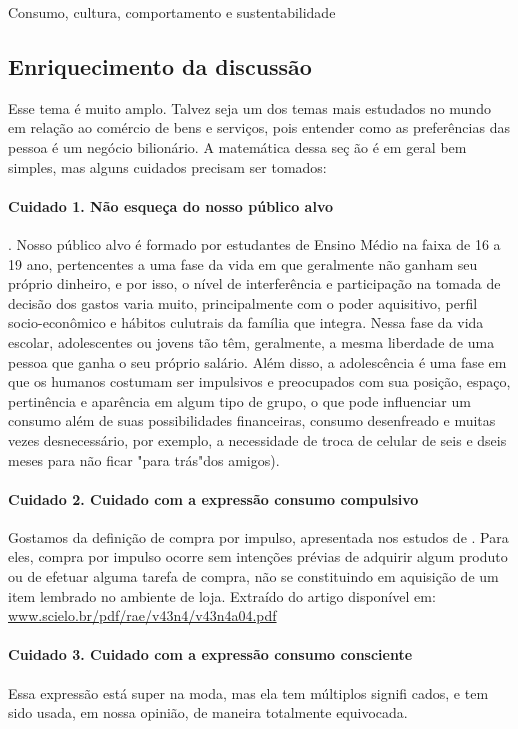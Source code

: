 \begin{paginatexto}{Consumo, cultura, comportamento e sustentabilidade}
\subsection*{Enriquecimento da discussão}

Esse tema é muito amplo. Talvez seja um dos temas mais estudados no mundo em relação ao comércio de bens e serviços, pois entender como as preferências das pessoa é um negócio bilionário. A matemática dessa seç ão é em geral bem simples, mas alguns cuidados precisam ser tomados:


\paragraph{Cuidado 1. Não esqueça do nosso público alvo}. Nosso público alvo é formado por estudantes de Ensino Médio na faixa de 16 a 19 ano, pertencentes a uma fase da vida em que geralmente não ganham seu próprio dinheiro, e por isso, o nível de interferência e participação na tomada de decisão dos gastos varia muito, principalmente com o poder aquisitivo, perfil socio-econômico e hábitos culutrais da família que integra. Nessa fase da vida escolar, adolescentes ou jovens tão têm, geralmente, a mesma liberdade de uma pessoa que ganha o seu próprio salário. Além disso, a adolescência é uma fase em que os humanos costumam ser impulsivos \citep{fonseca2005} e preocupados com sua posição, espaço, pertinência e aparência em algum tipo de grupo, o que pode influenciar um consumo além de suas possibilidades financeiras, consumo desenfreado e muitas vezes desnecessário, por exemplo, a necessidade de troca de celular de seis e dseis meses para não ficar "para trás"{}dos amigos).


\paragraph{Cuidado 2. Cuidado com a expressão consumo compulsivo}

Gostamos da definição de compra por impulso, apresentada nos estudos de \cite{BEATTY1998}. Para eles, compra por impulso ocorre sem intenções prévias de adquirir algum produto ou de efetuar alguma tarefa de compra, não se constituindo em aquisição de um item lembrado no ambiente de loja. Extraído do artigo disponível em: \url{www.scielo.br/pdf/rae/v43n4/v43n4a04.pdf}


\paragraph{Cuidado 3. Cuidado com a expressão consumo consciente} Essa expressão está super na moda, mas ela tem múltiplos signifi cados, e tem sido usada, em nossa opinião, de maneira totalmente equivocada.


\end{paginatexto}
